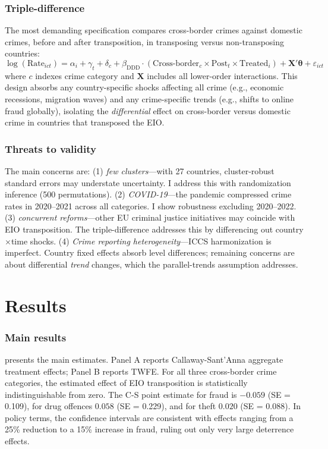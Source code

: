 \documentclass[12pt]{article}
\begin{document}
\subsubsection*{Triple-difference}  The most demanding specification compares cross-border crimes against domestic crimes, before and after transposition, in transposing versus non-transposing countries:
\begin{equation}
\log(\text{Rate}_{ict}) = \alpha_i + \gamma_t + \delta_c + \beta_{\text{DDD}} \cdot (\text{Cross-border}_c \times \text{Post}_t \times \text{Treated}_i) + \mathbf{X}'\boldsymbol{\theta} + \varepsilon_{ict}
\end{equation}
where $c$ indexes crime category and $\mathbf{X}$ includes all lower-order interactions. This design absorbs any country-specific shocks affecting all crime (e.g., economic recessions, migration waves) and any crime-specific trends (e.g., shifts to online fraud globally), isolating the \textit{differential} effect on cross-border versus domestic crime in countries that transposed the EIO.

\subsubsection*{Threats to validity}  The main concerns are: (1) \textit{few clusters}---with 27 countries, cluster-robust standard errors may understate uncertainty. I address this with randomization inference (500 permutations). (2) \textit{COVID-19}---the pandemic compressed crime rates in 2020--2021 across all categories. I show robustness excluding 2020--2022. (3) \textit{concurrent reforms}---other EU criminal justice initiatives may coincide with EIO transposition. The triple-difference addresses this by differencing out country$\times$time shocks. (4) \textit{Crime reporting heterogeneity}---ICCS harmonization is imperfect. Country fixed effects absorb level differences; remaining concerns are about differential \textit{trend} changes, which the parallel-trends assumption addresses.


\section{Results}

\subsubsection*{Main results}   presents the main estimates. Panel A reports Callaway-Sant'Anna aggregate treatment effects; Panel B reports TWFE. For all three cross-border crime categories, the estimated effect of EIO transposition is statistically indistinguishable from zero. The C-S point estimate for fraud is $-0.059$ (SE = 0.109), for drug offences $0.058$ (SE = 0.229), and for theft $0.020$ (SE = 0.088). In policy terms, the confidence intervals are consistent with effects ranging from a 25\% reduction to a 15\% increase in fraud, ruling out only very large deterrence effects.
\end{document}
